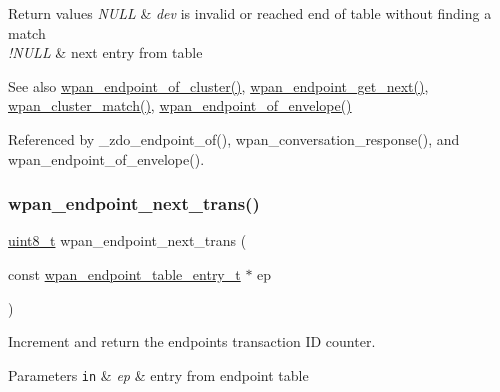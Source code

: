 \begin{DoxyRetVals}{Return values}
{\em N\+U\+LL} & {\itshape dev} is invalid or reached end of table without finding a match \\
\hline
{\em !\+N\+U\+LL} & next entry from table\\
\hline
\end{DoxyRetVals}
\begin{DoxySeeAlso}{See also}
\hyperlink{group__wpan__aps_ga2cc975231963e0eb75c449c11b1d95de}{wpan\+\_\+endpoint\+\_\+of\+\_\+cluster()}, \hyperlink{group__wpan__aps_gaca3b72047ea4e156ce9a977c13624b5c}{wpan\+\_\+endpoint\+\_\+get\+\_\+next()}, \hyperlink{group__wpan__aps_ga1c725384b21faf5953683d7b028c7be3}{wpan\+\_\+cluster\+\_\+match()}, \hyperlink{group__wpan__aps_gab448ec18a47178272336da5eacfa2290}{wpan\+\_\+endpoint\+\_\+of\+\_\+envelope()} 
\end{DoxySeeAlso}


Referenced by \+\_\+zdo\+\_\+endpoint\+\_\+of(), wpan\+\_\+conversation\+\_\+response(), and wpan\+\_\+endpoint\+\_\+of\+\_\+envelope().

\mbox{\label{group__wpan__aps_gaab1c77ccbd237270f11499fb6411599c}} 
\subsubsection{\texorpdfstring{wpan\+\_\+endpoint\+\_\+next\+\_\+trans()}{wpan\_endpoint\_next\_trans()}}
{\footnotesize\ttfamily \hyperlink{group__hal__dos_gae1affc9ca37cfb624959c866a73f83c2}{uint8\+\_\+t} wpan\+\_\+endpoint\+\_\+next\+\_\+trans (\begin{DoxyParamCaption}\item[{const \hyperlink{structwpan__endpoint__table__entry__t}{wpan\+\_\+endpoint\+\_\+table\+\_\+entry\+\_\+t} $\ast$}]{ep }\end{DoxyParamCaption})}



Increment and return the endpoint\textquotesingle{}s transaction ID counter. 


\begin{DoxyParams}[1]{Parameters}
\mbox{\tt in}  & {\em ep} & entry from endpoint table\\
\hline
\end{DoxyParams}

